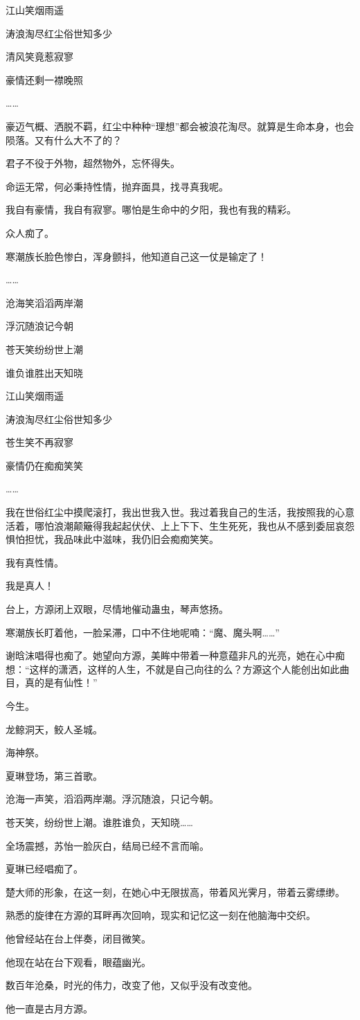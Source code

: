 \begin{this_body}
江山笑烟雨遥

涛浪淘尽红尘俗世知多少

清风笑竟惹寂寥

豪情还剩一襟晚照

……

豪迈气概、洒脱不羁，红尘中种种“理想”都会被浪花淘尽。就算是生命本身，也会陨落。又有什么大不了的？

君子不役于外物，超然物外，忘怀得失。

命运无常，何必秉持性情，抛弃面具，找寻真我呢。

我自有豪情，我自有寂寥。哪怕是生命中的夕阳，我也有我的精彩。

众人痴了。

寒潮族长脸色惨白，浑身颤抖，他知道自己这一仗是输定了！

……

沧海笑滔滔两岸潮

浮沉随浪记今朝

苍天笑纷纷世上潮

谁负谁胜出天知晓

江山笑烟雨遥

涛浪淘尽红尘俗世知多少

苍生笑不再寂寥

豪情仍在痴痴笑笑

……

我在世俗红尘中摸爬滚打，我出世我入世。我过着我自己的生活，我按照我的心意活着，哪怕浪潮颠簸得我起起伏伏、上上下下、生生死死，我也从不感到委屈哀怨惧怕担忧，我品味此中滋味，我仍旧会痴痴笑笑。

我有真性情。

我是真人！

台上，方源闭上双眼，尽情地催动蛊虫，琴声悠扬。

寒潮族长盯着他，一脸呆滞，口中不住地呢喃：“魔、魔头啊……”

谢晗沫唱得也痴了。她望向方源，美眸中带着一种意蕴非凡的光亮，她在心中痴想：“这样的潇洒，这样的人生，不就是自己向往的么？方源这个人能创出如此曲目，真的是有仙性！”

今生。

龙鲸洞天，鲛人圣城。

海神祭。

夏琳登场，第三首歌。

沧海一声笑，滔滔两岸潮。浮沉随浪，只记今朝。

苍天笑，纷纷世上潮。谁胜谁负，天知晓……

全场震撼，苏怡一脸灰白，结局已经不言而喻。

夏琳已经唱痴了。

楚大师的形象，在这一刻，在她心中无限拔高，带着风光霁月，带着云雾缥缈。

熟悉的旋律在方源的耳畔再次回响，现实和记忆这一刻在他脑海中交织。

他曾经站在台上伴奏，闭目微笑。

他现在站在台下观看，眼蕴幽光。

数百年沧桑，时光的伟力，改变了他，又似乎没有改变他。

他一直是古月方源。

\end{this_body}


